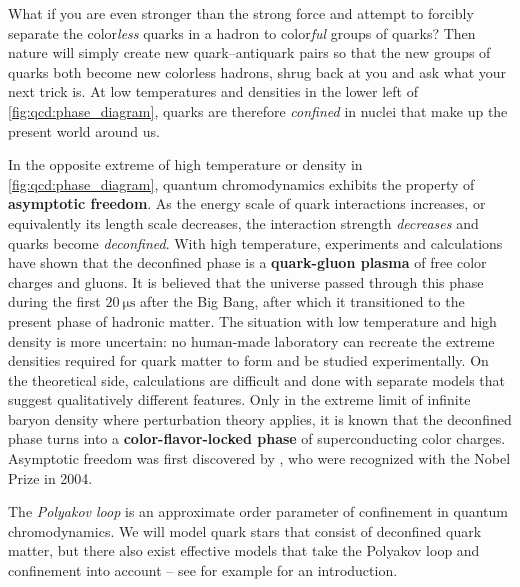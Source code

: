 What if you are even stronger than the strong force and attempt to forcibly separate the color\emph{less} quarks in a hadron to color\emph{ful} groups of quarks?
Then nature will simply create new quark--antiquark pairs so that the new groups of quarks both become new colorless hadrons,
shrug back at you and ask what your next trick is.
At low temperatures and densities in the lower left of \cref{fig:qcd:phase_diagram}, quarks are therefore \emph{confined}
in nuclei that make up the present world around us.

In the opposite extreme of high temperature or density in \cref{fig:qcd:phase_diagram}, quantum chromodynamics exhibits the property of \textbf{asymptotic freedom}.
As the energy scale of quark interactions increases, or equivalently its length scale decreases, the interaction strength \emph{decreases} and quarks become \emph{deconfined}.
With high temperature, experiments and calculations have shown that the deconfined phase is a \textbf{quark-gluon plasma} of free color charges and gluons.
It is believed that the universe passed through this phase during the first $\SI{20}{\micro\second}$ after the Big Bang, after which it transitioned to the present phase of hadronic matter.
The situation with low temperature and high density is more uncertain:
no human-made laboratory can recreate the extreme densities required for quark matter to form and be studied experimentally.
On the theoretical side, calculations are difficult and done with separate models that suggest qualitatively different features.
Only in the extreme limit of infinite baryon density where perturbation theory applies,
it is known that the deconfined phase turns into a \textbf{color-flavor-locked phase} of superconducting color charges. \cite{ref:qcd_phase_diagram_dense}
Asymptotic freedom was first discovered by \cite{ref:asymptotic_freedom_gross_wilczek,ref:asymptotic_freedom_politzer}, who were recognized with the Nobel Prize in 2004.

The \emph{Polyakov loop} is an approximate order parameter of confinement in quantum chromodynamics.
We will model quark stars that consist of deconfined quark matter,
but there also exist effective models that take the Polyakov loop and confinement into account
-- see for example \cite{ref:master_folkestad} for an introduction.


